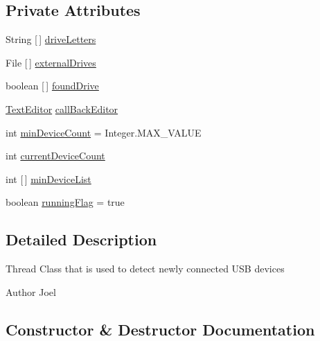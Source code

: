 \subsection*{Private Attributes}
\begin{DoxyCompactItemize}
\item 
String \mbox{[}$\,$\mbox{]} \mbox{\hyperlink{classlogic_1_1_u_s_b_detection_ac59408f84f8634356ebca0e200cd52dc}{drive\+Letters}}
\item 
File \mbox{[}$\,$\mbox{]} \mbox{\hyperlink{classlogic_1_1_u_s_b_detection_adf43cb71a6f51974f6d3bb7e5ee0a07f}{external\+Drives}}
\item 
boolean \mbox{[}$\,$\mbox{]} \mbox{\hyperlink{classlogic_1_1_u_s_b_detection_a9116f6bee29fd7487d59645730060089}{found\+Drive}}
\item 
\mbox{\hyperlink{classlogic_1_1_text_editor}{Text\+Editor}} \mbox{\hyperlink{classlogic_1_1_u_s_b_detection_a6e86a8602e08d2ed9376a865d18d55e8}{call\+Back\+Editor}}
\item 
int \mbox{\hyperlink{classlogic_1_1_u_s_b_detection_a6fb3b9b0a01b386c89d2cd1b1ed14207}{min\+Device\+Count}} = Integer.\+M\+A\+X\+\_\+\+V\+A\+L\+UE
\item 
int \mbox{\hyperlink{classlogic_1_1_u_s_b_detection_a724f15b2ef5c95e5ed8c1d64e14dc237}{current\+Device\+Count}}
\item 
int \mbox{[}$\,$\mbox{]} \mbox{\hyperlink{classlogic_1_1_u_s_b_detection_a7b0efef235f82ac00e21c0ded12f5791}{min\+Device\+List}}
\item 
boolean \mbox{\hyperlink{classlogic_1_1_u_s_b_detection_a9f2381b5bc0bb9c9fee03d4efcfa03cb}{running\+Flag}} = true
\end{DoxyCompactItemize}


\subsection{Detailed Description}
Thread Class that is used to detect newly connected U\+SB devices \begin{DoxyAuthor}{Author}
Joel 
\end{DoxyAuthor}


\subsection{Constructor \& Destructor Documentation}
\mbox{\label{classlogic_1_1_u_s_b_detection_a4b63c640806fa72a6278f62ae446da76}} 
